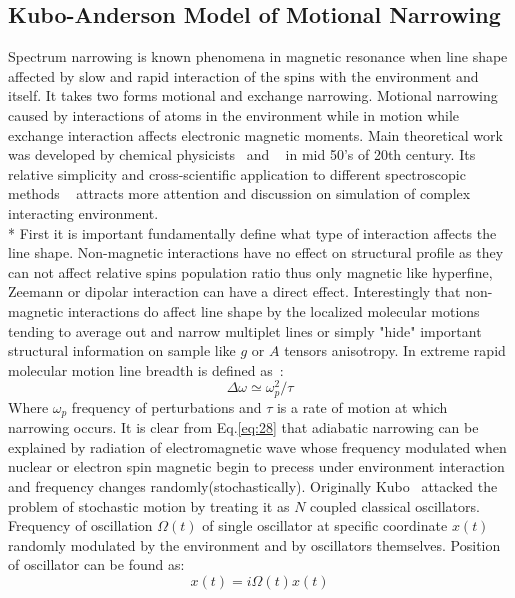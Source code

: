 \subsection{Kubo-Anderson Model of Motional Narrowing}\label{kuboandersonsection}
Spectrum narrowing is known phenomena in magnetic resonance when line shape affected by slow and rapid interaction of the spins with the environment and itself. It takes two forms motional and exchange narrowing. Motional narrowing caused by interactions of atoms in the environment while in motion while exchange interaction affects electronic magnetic moments. Main theoretical work was developed by chemical physicists~\cite{anderson} and ~\cite{kubo} in mid 50's of 20th century. Its relative simplicity and cross-scientific application to different spectroscopic methods ~\cite{inda} attracts more attention and discussion on simulation of complex interacting environment.\\*
First it is important fundamentally define what type of interaction affects the line shape. Non-magnetic interactions have no effect on structural profile as they can not affect relative spins population ratio thus only magnetic like hyperfine, Zeemann or dipolar interaction can have a direct effect. Interestingly that non-magnetic interactions do affect line shape by the localized molecular motions tending to average out and narrow multiplet lines or simply "hide" important structural information on sample like $g$ or $A$ tensors anisotropy. In extreme rapid molecular motion line breadth is defined as~\cite{anderson}: 
\begin{equation}\label{eq:28}
\Delta\omega\simeq \omega_p^2/\tau
\end{equation} 
Where $\omega_p$ frequency of perturbations and $\tau$ is a rate of motion at which narrowing occurs. It is clear from Eq.\ref{eq:28} that adiabatic narrowing can be explained by radiation of electromagnetic wave whose frequency modulated when nuclear or electron spin magnetic begin to precess under environment interaction and frequency changes randomly(stochastically). Originally Kubo~\cite[pp:101-126]{kubo1} attacked the problem of stochastic motion by treating it as $N$ coupled classical oscillators. Frequency of oscillation $\Omega(t)$ of single oscillator at specific coordinate $x(t)$ randomly modulated by the environment and by oscillators themselves. Position of oscillator can be found as: 
\begin{equation}\label{eq:oscill}
x(t)=i\Omega(t)x(t)
\end{equation} 
